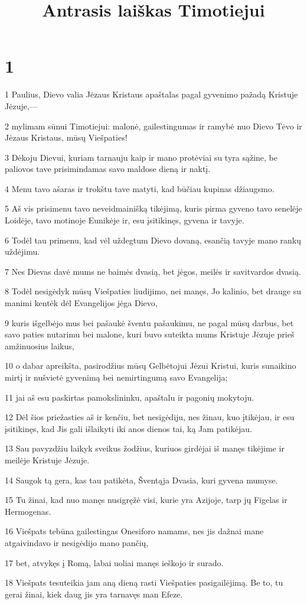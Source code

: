 

\title{Antrasis laiškas Timotiejui}

\chapter{1}


\par 1 Paulius, Dievo valia Jėzaus Kristaus apaštalas pagal gyvenimo pažadą Kristuje Jėzuje,— 
\par 2 mylimam sūnui Timotiejui: malonė, gailestingumas ir ramybė nuo Dievo Tėvo ir Jėzaus Kristaus, mūsų Viešpaties! 
\par 3 Dėkoju Dievui, kuriam tarnauju kaip ir mano protėviai su tyra sąžine, be paliovos tave prisimindamas savo maldose dieną ir naktį. 
\par 4 Menu tavo ašaras ir trokštu tave matyti, kad būčiau kupinas džiaugsmo. 
\par 5 Aš vis prisimenu tavo neveidmainišką tikėjimą, kuris pirma gyveno tavo senelėje Loidėje, tavo motinoje Eunikėje ir, esu įsitikinęs, gyvena ir tavyje. 
\par 6 Todėl tau primenu, kad vėl uždegtum Dievo dovaną, esančią tavyje mano rankų uždėjimu. 
\par 7 Nes Dievas davė mums ne baimės dvasią, bet jėgos, meilės ir savitvardos dvasią. 
\par 8 Todėl nesigėdyk mūsų Viešpaties liudijimo, nei manęs, Jo kalinio, bet drauge su manimi kentėk dėl Evangelijos jėga Dievo, 
\par 9 kuris išgelbėjo mus bei pašaukė šventu pašaukimu, ne pagal mūsų darbus, bet savo paties nutarimu bei malone, kuri buvo suteikta mums Kristuje Jėzuje prieš amžinuosius laikus, 
\par 10 o dabar apreikšta, pasirodžius mūsų Gelbėtojui Jėzui Kristui, kuris sunaikino mirtį ir nušvietė gyvenimą bei nemirtingumą savo Evangelija; 
\par 11 jai aš esu paskirtas pamokslininku, apaštalu ir pagonių mokytoju. 
\par 12 Dėl šios priežasties aš ir kenčiu, bet nesigėdiju, nes žinau, kuo įtikėjau, ir esu įsitikinęs, kad Jis gali išlaikyti iki anos dienos tai, ką Jam patikėjau. 
\par 13 Sau pavyzdžiu laikyk sveikus žodžius, kuriuos girdėjai iš manęs tikėjime ir meilėje Kristuje Jėzuje. 
\par 14 Saugok tą gera, kas tau patikėta, Šventąja Dvasia, kuri gyvena mumyse. 
\par 15 Tu žinai, kad nuo manęs nusigręžė visi, kurie yra Azijoje, tarp jų Figelas ir Hermogenas. 
\par 16 Viešpats tebūna gailestingas Onesiforo namams, nes jis dažnai mane atgaivindavo ir nesigėdijo mano pančių, 
\par 17 bet, atvykęs į Romą, labai uoliai manęs ieškojo ir surado. 
\par 18 Viešpats tesuteikia jam aną dieną rasti Viešpaties pasigailėjimą. Be to, tu gerai žinai, kiek daug jis yra tarnavęs man Efeze.



